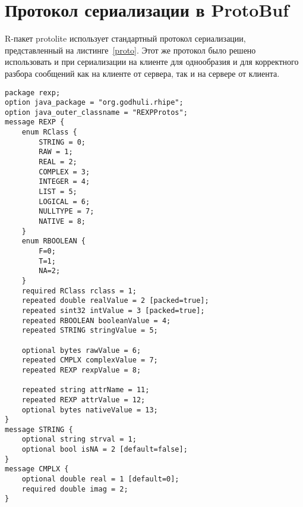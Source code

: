 \documentclass[specification,annotation]{itmo-student-thesis}
\begin{document}
\chapter{Протокол сериализации в ProtoBuf}
R-пакет protolite использует стандартный протокол сериализации, представленный на листинге~\ref{proto}. Этот же протокол было решено использовать и при сериализации на клиенте для однообразия и для корректного разбора сообщений как на клиенте от сервера, так и на сервере от клиента.
\begin{lstlisting}[float=!h,caption={Протокол сериализации R-пакета protolite},label={proto}]
package rexp;
option java_package = "org.godhuli.rhipe";
option java_outer_classname = "REXPProtos";
message REXP {
    enum RClass {
        STRING = 0;
        RAW = 1;
        REAL = 2;
        COMPLEX = 3;
        INTEGER = 4;
        LIST = 5;
        LOGICAL = 6;
        NULLTYPE = 7;
        NATIVE = 8;
    }
    enum RBOOLEAN {
        F=0;
        T=1;
        NA=2;
    }
    required RClass rclass = 1;
    repeated double realValue = 2 [packed=true];
    repeated sint32 intValue = 3 [packed=true];
    repeated RBOOLEAN booleanValue = 4;
    repeated STRING stringValue = 5;

    optional bytes rawValue = 6;
    repeated CMPLX complexValue = 7;
    repeated REXP rexpValue = 8;

    repeated string attrName = 11;
    repeated REXP attrValue = 12;
    optional bytes nativeValue = 13;
}
message STRING {
    optional string strval = 1;
    optional bool isNA = 2 [default=false];
}
message CMPLX {
    optional double real = 1 [default=0];
    required double imag = 2;
}
\end{lstlisting}
\end{document}

